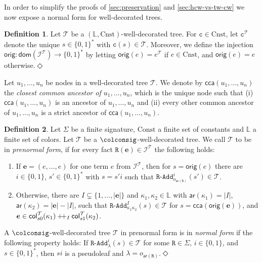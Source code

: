 \documentclass[10pt,a4paper]{amsart}
\theoremstyle{definition}
\numberwithin{equation}{section}
\theoremstyle{plain}
\theoremstyle{definition}
\newtheorem{definition}[definition]{Definition}
\theoremstyle{myexample}
\theoremstyle{plain}
\theoremstyle{definition}
\renewcommand{\vec}[1]{\boldsymbol{#1}}
\newcommand{\instance}{\mathcal{I}}
\newcommand{\inst}{\instance}
\newcommand{\adom}[1]{\fcn{dom}(#1)}
\newcommand{\origcol}{o}
\newcommand{\cols}{\mathbb{L}}
\newcommand{\arity}[1]{\fcn{ar}(#1)}
\newcommand{\radd}[4]{#4\pred{\texttt{-}Add}^{#3}_{#1#2}}
\newcommand{\unradd}[2]{#2\pred{\texttt{-}Add}_{#1}}
\newcommand{\fcn}[1]{\mathsf{#1}}
\newcommand{\col}{\fcn{col}}
\newcommand{\pred}[1]{\mathtt{#1}}
\newcommand{\const}[1]{\mathtt{#1}}
\newcommand{\ve}{\vec{e}}
\newcommand{\rpred}{\pred{R}}
\newcommand{\concat}{\mathbin{{+}\hspace{-0.5ex}{+}}}
\newcommand{\defend}{\hfill\ensuremath{\Diamond}}
\begin{document}
In order to simplify the proofs of \cref{sec:preservation} and \cref{sec:hcw-vs-tw-cw} we now expose a normal form for well-decorated trees.
\begin{definition}\label{def:mso-orig}
	Let $\mathcal{T}$ be a $(\cols,\mathrm{Cnst})$-well-decorated tree.
	For $\const{c}\in \mathrm{Cnst}$, let $\const{c}^\mathcal{T}$ denote the unique $s \in \{0,1\}^*$ with $\pred{c}(s)\in \mathcal{T}$. Moreover, we define the injection $\fcn{orig}: \adom{\inst^\mathcal{T}} \to \{0,1\}^*$ 
	by letting $\fcn{orig}(e)=e^\mathcal{T}$ if $e\in \mathrm{Cnst}$, and $\fcn{orig}(e)=e$ otherwise.\defend
\end{definition}
Let $u_1, \ldots, u_n$ be nodes in a well-decorated tree $\mathcal{T}$. We denote by $\fcn{cca}(u_1, \ldots, u_n)$ the \emph{closest common ancestor of $u_1, \ldots, u_n$}, which is the unique node such that (i) $\fcn{cca}(u_1, \ldots, u_n)$ is an ancestor of $u_1, \ldots, u_n$ and (ii) every other common ancestor of $u_1, \ldots, u_n$ is a strict ancestor of $\fcn{cca}(u_1, \ldots, u_n)$.


\begin{definition}
	Let $\Sigma$ be a finite signature, $\mathrm{Const}$ a finite set of constants and $\cols$ a finite set of colors. Let $\mathcal{T}$ be a $\colconsig$-well-decorated tree. We call $\mathcal{T}$ to be in \emph{prenormal form}, if for every fact $\rpred(\ve)\in\inst^{\mathcal{T}}$ the following holds: 
	\begin{enumerate}
		\item If $\ve = (e, \ldots, e)$ for one term $e$ from $\inst^{\mathcal{T}}$, then for $s = \fcn{orig}(e)$ there are $i\in\{ 0,1 \}$, $s'\in\{ 0,1 \}^*$ with $s = s'i$ such that $\unradd{\origcol_{\arity{\rpred}}}{\rpred}^{i}(s')\in\mathcal{T}$.
		\item Otherwise, there are $I\subsetneq \{ 1, \ldots, |\ve| \}$ and $\kappa_1, \kappa_2\in\cols$ with $\arity{\kappa_1} = |I|$, $\arity{\kappa_2} = |\ve|-|I|$, such that
$\radd{\kappa_1}{\kappa_2}{I}{\rpred}(s) \in\mathcal{T}$ for $s = \fcn{cca}(\fcn{orig}(\ve))$, and $\ve \in \col_{s0}^{\mathcal{T}}(\kappa_1) \concat_{I} \col_{s1}^{\mathcal{T}}(\kappa_2)$.
	\end{enumerate}
	A $\colconsig$-well-decorated tree $\mathcal{T}$ in prenormal form is in \emph{normal form} if the following property holds: If $\unradd{\lambda}{\rpred}^{i}(s)\in\mathcal{T}$ for some $\rpred\in\Sigma$, $i\in\{ 0,1 \}$, and $s\in\{ 0,1 \}^*$, then $si$ is a pseudoleaf and $\lambda = \origcol_{\arity{\rpred}}$.\defend
\end{definition}
\end{document}
